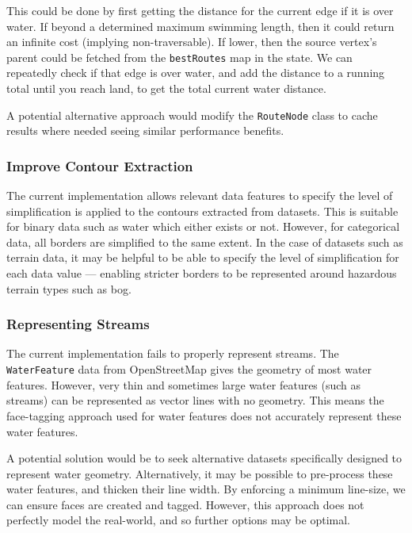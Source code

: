 \documentclass[12pt]{article}
\begin{document}
This could be done by first getting the distance for the current edge if it is over water. If beyond a determined maximum swimming length, then it could return an infinite cost (implying non-traversable). If lower, then the source vertex's parent could be fetched from the \texttt{bestRoutes} map in the state. We can repeatedly check if that edge is over water, and add the distance to a running total until you reach land, to get the total current water distance.

A potential alternative approach would modify the \texttt{RouteNode} class to cache results where needed seeing similar performance benefits.

\subsubsection{Improve Contour Extraction}

The current implementation allows relevant data features to specify the level of simplification is applied to the contours extracted from datasets. This is suitable for binary data such as water which either exists or not. However, for categorical data, all borders are simplified to the same extent. In the case of datasets such as terrain data, it may be helpful to be able to specify the level of simplification for each data value --- enabling stricter borders to be represented around hazardous terrain types such as bog.

\subsubsection{Representing Streams}

The current implementation fails to properly represent streams. The \texttt{WaterFeature} data from OpenStreetMap gives the geometry of most water features. However, very thin and sometimes large water features (such as streams) can be represented as vector lines with no geometry. This means the face-tagging approach used for water features does not accurately represent these water features.

A potential solution would be to seek alternative datasets specifically designed to represent water geometry. Alternatively, it may be possible to pre-process these water features, and thicken their line width. By enforcing a minimum line-size, we can ensure faces are created and tagged. However, this approach does not perfectly model the real-world, and so further options may be optimal.
\end{document}
